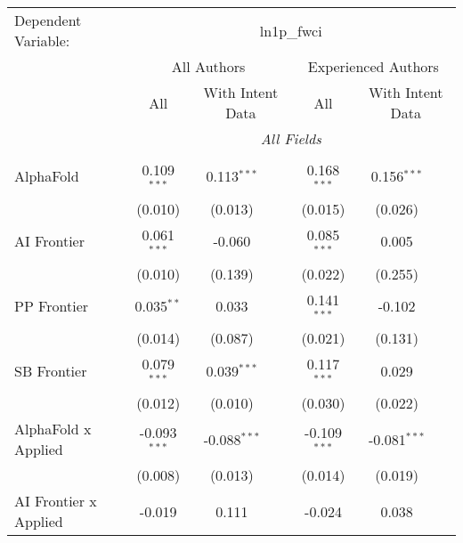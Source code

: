 \begingroup
\centering
\begin{tabular}{lcccccc}
   \tabularnewline \midrule \midrule
   Dependent Variable: & \multicolumn{6}{c}{ln1p\_fwci}\\
 & \multicolumn{3}{c}{All Authors} & \multicolumn{3}{c}{Experienced Authors} \\
\cmidrule(lr){2-4} \cmidrule(lr){5-7}
 & \multicolumn{1}{c}{All} & \multicolumn{2}{c}{With Intent Data} & \multicolumn{1}{c}{All} & \multicolumn{2}{c}{With Intent Data} \\
\cmidrule(lr){2-2} \cmidrule(lr){3-4} \cmidrule(lr){5-5} \cmidrule(lr){6-7}
 & \multicolumn{6}{c}{\textit{All Fields}} \\ \\
   AlphaFold                      & 0.109$^{***}$  & 0.113$^{***}$  &                & 0.168$^{***}$  & 0.156$^{***}$  &   \\   
                                  & (0.010)        & (0.013)        &                & (0.015)        & (0.026)        &   \\   
   AI Frontier                    & 0.061$^{***}$  & -0.060         &                & 0.085$^{***}$  & 0.005          &   \\   
                                  & (0.010)        & (0.139)        &                & (0.022)        & (0.255)        &   \\   
   PP Frontier                    & 0.035$^{**}$   & 0.033          &                & 0.141$^{***}$  & -0.102         &   \\   
                                  & (0.014)        & (0.087)        &                & (0.021)        & (0.131)        &   \\   
   SB Frontier                    & 0.079$^{***}$  & 0.039$^{***}$  &                & 0.117$^{***}$  & 0.029          &   \\   
                                  & (0.012)        & (0.010)        &                & (0.030)        & (0.022)        &   \\   
   AlphaFold x Applied            & -0.093$^{***}$ & -0.088$^{***}$ &                & -0.109$^{***}$ & -0.081$^{***}$ &   \\   
                                  & (0.008)        & (0.013)        &                & (0.014)        & (0.019)        &   \\   
   AI Frontier x Applied          & -0.019         & 0.111          &                & -0.024         & 0.038          &   \\   

\end{tabular}

